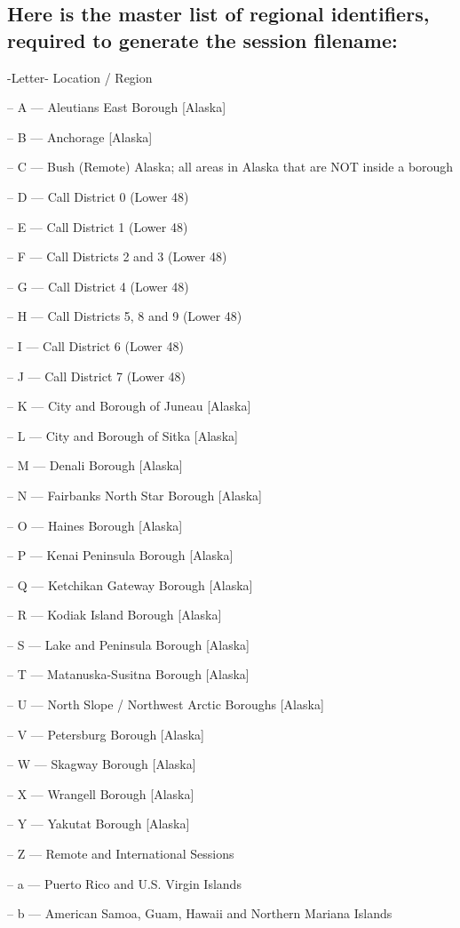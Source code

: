 \subsection*{Here is the master list of regional identifiers, required to generate the session filename\+:}

-\/\+Letter-\/ Location / Region

-- A --- Aleutians East Borough \mbox{[}Alaska\mbox{]}

-- B --- Anchorage \mbox{[}Alaska\mbox{]}

-- C --- Bush (Remote) Alaska; all areas in Alaska that are N\+OT inside a borough

-- D --- Call District 0 (Lower 48)

-- E --- Call District 1 (Lower 48)

-- F --- Call Districts 2 and 3 (Lower 48)

-- G --- Call District 4 (Lower 48)

-- H --- Call Districts 5, 8 and 9 (Lower 48)

-- I --- Call District 6 (Lower 48)

-- J --- Call District 7 (Lower 48)

-- K --- City and Borough of Juneau \mbox{[}Alaska\mbox{]}

-- L --- City and Borough of Sitka \mbox{[}Alaska\mbox{]}

-- M --- Denali Borough \mbox{[}Alaska\mbox{]}

-- N --- Fairbanks North Star Borough \mbox{[}Alaska\mbox{]}

-- O --- Haines Borough \mbox{[}Alaska\mbox{]}

-- P --- Kenai Peninsula Borough \mbox{[}Alaska\mbox{]}

-- Q --- Ketchikan Gateway Borough \mbox{[}Alaska\mbox{]}

-- R --- Kodiak Island Borough \mbox{[}Alaska\mbox{]}

-- S --- Lake and Peninsula Borough \mbox{[}Alaska\mbox{]}

-- T --- Matanuska-\/\+Susitna Borough \mbox{[}Alaska\mbox{]}

-- U --- North Slope / Northwest Arctic Boroughs \mbox{[}Alaska\mbox{]}

-- V --- Petersburg Borough \mbox{[}Alaska\mbox{]}

-- W --- Skagway Borough \mbox{[}Alaska\mbox{]}

-- X --- Wrangell Borough \mbox{[}Alaska\mbox{]}

-- Y --- Yakutat Borough \mbox{[}Alaska\mbox{]}

-- Z --- Remote and International Sessions

-- a --- Puerto Rico and U.\+S. Virgin Islands

-- b --- American Samoa, Guam, Hawaii and Northern Mariana Islands 